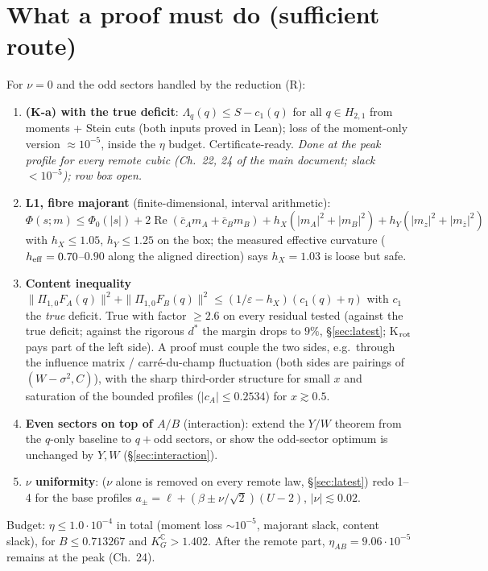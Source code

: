 \documentclass[11pt,a4paper]{article}
\newcommand{\C}{\mathbb{C}}\newcommand{\R}{\mathbb{R}}\newcommand{\E}{\mathbb{E}}\newcommand{\Hc}[2]{H_{#1,#2}}
\renewcommand{\Re}{\operatorname{Re}}\newcommand{\Var}{\operatorname{Var}}\newcommand{\ph}{\operatorname{phase}}\newcommand{\st}[1]{\textsf{[#1]}}\newcommand{\brkus}{\textunderscore\allowbreak}\usepackage{xstring,adjustbox}\DeclareRobustCommand{\code}[1]{\begingroup\noexpandarg\StrSubstitute{#1}{/}{/\allowbreak}[\brktmp]\texttt{\let\_\brkus\hyphenchar\font=`\-\brktmp}\endgroup}\setlength{\emergencystretch}{3em}
\begin{document}
\section{What a proof must do (sufficient route)}
For $\nu=0$ and the odd sectors handled by the reduction (R):
\begin{enumerate}
\item \textbf{(K-a) with the true deficit}: $\Lambda_q(q)\le S-c_1(q)$ for all $q\in\Hc21$ from moments + Stein cuts (both inputs proved in Lean); loss of the moment-only version
$\approx10^{-5}$, inside the $\eta$ budget. Certificate-ready. \emph{Done at the peak profile for every remote cubic (Ch.~22, 24 of the main document; slack $<10^{-5}$); row box open.}
\item \textbf{L1, fibre majorant} (finite-dimensional, interval arithmetic): $\Phi(s;m)\le\Phi_0(|s|)+2\Re(\bar c_Am_A+\bar c_Bm_B)+h_X(|m_A|^2+|m_B|^2)+h_Y(|m_z|^2+|m_{\bar z}|^2)$ with
$h_X\le1.05$, $h_Y\le1.25$ on the box; the measured effective curvature ($h_{\rm eff}=0.70$--$0.90$ along the aligned direction) says $h_X=1.03$ is loose but safe.
\item \textbf{Content inequality} $\|\Pi_{1,0}F_A(q)\|^2+\|\Pi_{1,0}F_B(q)\|^2\le(1/\varepsilon-h_X)(c_1(q)+\eta)$ with $c_1$ the \emph{true} deficit. True with factor $\ge2.6$ on every
residual tested (against the true deficit; against the rigorous $d^*$ the margin drops to $9\%$, \S\ref{sec:latest}; K$_{\rm rot}$ pays part of the left side). A proof must couple the two sides, e.g.\ through the influence matrix / carré-du-champ fluctuation (both sides are pairings of $(W-\sigma^2,C)$), with the sharp
third-order structure for small $x$ and saturation of the bounded profiles ($|c_A|\le0.2534$) for $x\gtrsim0.5$.
\item \textbf{Even sectors on top of $A/B$} (interaction): extend the $Y/W$ theorem from the $q$-only baseline to $q+$odd sectors, or show the odd-sector optimum is unchanged by $Y,W$
(\S\ref{sec:interaction}).
\item \textbf{$\nu$ uniformity}: ($\nu$ alone is removed on every remote law, \S\ref{sec:latest}) redo 1--4 for the base profiles $a_\pm=\ell+(\beta\pm\nu/\sqrt2)(U-2)$, $|\nu|\lesssim0.02$.
\end{enumerate}
Budget: $\eta\le1.0\cdot10^{-4}$ in total (moment loss $\sim10^{-5}$, majorant slack, content slack), for $B\le0.713267$ and $K_G^{\C}>1.402$. After the remote part, $\eta_{AB}=9.06\cdot10^{-5}$ remains at the peak (Ch.~24).
\end{document}
